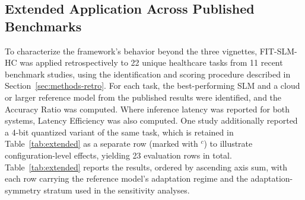 \documentclass[11pt]{article}
\begin{document}
\subsection{Extended Application Across Published Benchmarks}
\label{sec:extended}

To characterize the framework's behavior beyond the three vignettes, FIT-SLM-HC was applied retrospectively to 22 unique healthcare tasks from 11 recent benchmark studies, using the identification and scoring procedure described in Section~\ref{sec:methods-retro}. For each task, the best-performing SLM and a cloud or larger reference model from the published results were identified, and the Accuracy Ratio was computed. Where inference latency was reported for both systems, Latency Efficiency was also computed. One study \cite{Grothey2025} additionally reported a 4-bit quantized variant of the same task, which is retained in Table~\ref{tab:extended} as a separate row (marked with $^c$) to illustrate configuration-level effects, yielding 23 evaluation rows in total. Table~\ref{tab:extended} reports the results, ordered by ascending axis sum, with each row carrying the reference model's adaptation regime and the adaptation-symmetry stratum used in the sensitivity analyses.
\end{document}
